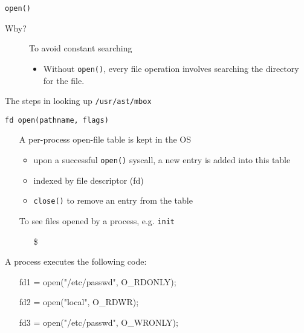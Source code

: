 \begin{frame}{\texttt{open()}}
  \begin{description}
    \item[Why?] To avoid constant searching
    \begin{itemize}
    \item Without \texttt{open()}, every file operation involves searching the directory for
      the file.
    \end{itemize}
  \end{description}
  The steps in looking up \texttt{/usr/ast/mbox}
  \begin{center}\label{fig:dir-lookup}
    \mode<beamer>{ \texttt{[image: 04-35]} }%
  \end{center}
\end{frame}

\begin{frame}
  \begin{block}{\texttt{fd open(pathname, flags)}}
    \begin{itemize}
    \item[] A per-process \alert{open-file table} is kept in the OS
      \begin{itemize}
      \item upon a successful \texttt{open()} syscall, a new entry is added into this table
      \item indexed by \alert{file descriptor (fd)}
      \item \texttt{close()} to remove an entry from the table
      \end{itemize}
    \item[] To see files opened by a process, e.g. \texttt{init}
      \begin{itemize}
      \item[\$] 
      \end{itemize}
    \end{itemize}
  \end{block}
    \qquad{}
\end{frame}

\begin{frame}
  \begin{iblock}{A process executes the following code:}\ttfamily
    \begin{itemize}
    \item[] fd1 = open("/etc/passwd", O\_RDONLY);
    \item[] fd2 = open("local", O\_RDWR);
    \item[] fd3 = open("/etc/passwd", O\_WRONLY);
    \end{itemize}
  \end{iblock}
  \begin{center}
  \end{center}
\end{frame}


